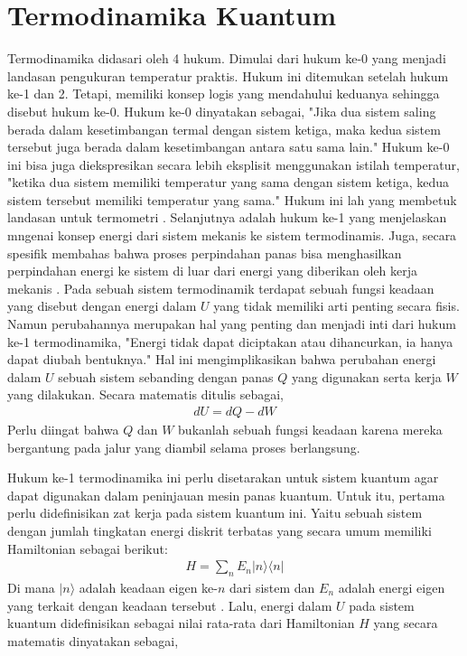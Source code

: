 \section{Termodinamika Kuantum}
Termodinamika didasari oleh 4 hukum. Dimulai dari hukum ke-0 yang menjadi landasan pengukuran temperatur praktis. Hukum ini ditemukan setelah hukum ke-1 dan 2. Tetapi, memiliki konsep logis yang mendahului keduanya sehingga disebut hukum ke-0. Hukum ke-0 dinyatakan sebagai, "Jika dua sistem saling berada dalam kesetimbangan termal dengan sistem ketiga, maka kedua sistem tersebut juga berada dalam kesetimbangan antara satu sama lain." Hukum ke-0 ini bisa juga diekspresikan secara lebih eksplisit menggunakan istilah temperatur, "ketika dua sistem memiliki temperatur yang sama dengan sistem ketiga, kedua sistem tersebut memiliki temperatur yang sama." Hukum ini lah yang membetuk landasan untuk termometri \cite{Turns2020Thermo}. Selanjutnya adalah hukum ke-1 yang menjelaskan mngenai konsep energi dari sistem mekanis ke sistem termodinamis. Juga, secara spesifik membahas bahwa proses perpindahan panas bisa menghasilkan perpindahan energi ke sistem di luar dari energi yang diberikan oleh kerja mekanis \cite{Lewis2020Thermo}. Pada sebuah sistem termodinamik terdapat sebuah fungsi keadaan yang disebut dengan energi dalam \(U\) yang tidak memiliki arti penting secara fisis. Namun perubahannya merupakan hal yang penting dan menjadi inti dari hukum ke-1 termodinamika, "Energi tidak dapat diciptakan atau dihancurkan, ia hanya dapat diubah bentuknya." Hal ini mengimplikasikan bahwa perubahan energi dalam \(U\) sebuah sistem sebanding dengan panas \(Q\) yang digunakan serta kerja \(W\) yang dilakukan. Secara matematis ditulis sebagai,
\begin{align}
    dU = dQ - dW
\end{align}
Perlu diingat bahwa \(Q\) dan \(W\) bukanlah sebuah fungsi keadaan karena mereka bergantung pada jalur yang diambil selama proses berlangsung. \cite{Sekerka2015Thermal}
\par Hukum ke-1 termodinamika ini perlu disetarakan untuk sistem kuantum agar dapat digunakan dalam peninjauan mesin panas kuantum. Untuk itu, pertama perlu didefinisikan zat kerja pada sistem kuantum ini. Yaitu sebuah sistem dengan jumlah tingkatan energi diskrit terbatas yang secara umum memiliki Hamiltonian sebagai berikut:
\begin{align}
    H = \sum_n E_n |n\rangle \langle n|
\end{align}
Di mana \(|n\rangle\) adalah keadaan eigen ke-\(n\) dari sistem dan \(E_n\) adalah energi eigen yang terkait dengan keadaan tersebut \cite{LeBellac2011Quantum}. Lalu, energi dalam \(U\) pada sistem kuantum didefinisikan sebagai nilai rata-rata dari Hamiltonian \(H\) yang secara matematis dinyatakan sebagai,
